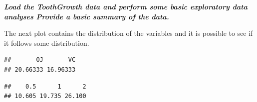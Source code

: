 \documentclass[
]{article}
\newenvironment{Shaded}{\begin{snugshade}}{\end{snugshade}}
\newcommand{\KeywordTok}[1]{\textcolor[rgb]{0.13,0.29,0.53}{\textbf{#1}}}
\newcommand{\NormalTok}[1]{#1}
\newcommand{\OperatorTok}[1]{\textcolor[rgb]{0.81,0.36,0.00}{\textbf{#1}}}
\newcommand{\StringTok}[1]{\textcolor[rgb]{0.31,0.60,0.02}{#1}}
\begin{document}
\textbf{\emph{Load the ToothGrowth data and perform some basic
exploratory data analyses Provide a basic summary of the data.}}

The next plot contains the distribution of the variables and it is
possible to see if it follows some distribution.

\begin{Shaded}
\end{Shaded}

\begin{verbatim}
##       OJ       VC 
## 20.66333 16.96333
\end{verbatim}

\begin{Shaded}
\end{Shaded}

\begin{verbatim}
##    0.5      1      2 
## 10.605 19.735 26.100
\end{verbatim}
\end{document}
